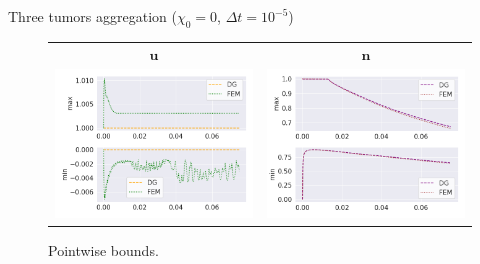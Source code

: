 \begin{frame}{Three tumors aggregation ($\chi_0=0$, $\Delta t=10^{-5}$)}
	\begin{figure}
		\centering
		\begin{tabular}{cc}
			\hspace*{1cm}$\boldsymbol{u}$ & \hspace*{0.5cm}$\boldsymbol{n}$\\
			\includegraphics[scale=0.33]{img/three_tumors/tumor_min-max_u_chi-0.png} &
			\includegraphics[scale=0.33]{img/three_tumors/tumor_min-max_n_chi-0.png}
		\end{tabular}
		\caption{Pointwise bounds.}
	\end{figure}
\end{frame}
